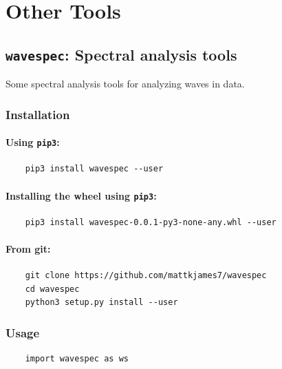 \chapter{Other Tools}

	
	\section{\texttt{wavespec}: Spectral analysis tools}

	Some spectral analysis tools for analyzing waves in data.
	
	\subsection{Installation}
	
	\subsubsection{Using \texttt{pip3}:}
	
	\begin{verbatim}
	pip3 install wavespec --user
	\end{verbatim}
	
	\subsubsection{Installing the wheel using \texttt{pip3}:}
	
	\begin{verbatim}
	pip3 install wavespec-0.0.1-py3-none-any.whl --user
	\end{verbatim}
	
	\subsubsection{From git:}
	 
	\begin{verbatim}
	git clone https://github.com/mattkjames7/wavespec
	cd wavespec
	python3 setup.py install --user
	\end{verbatim}
	
	\subsection{Usage}
	
	\begin{verbatim}
	import wavespec as ws
	\end{verbatim}
	
